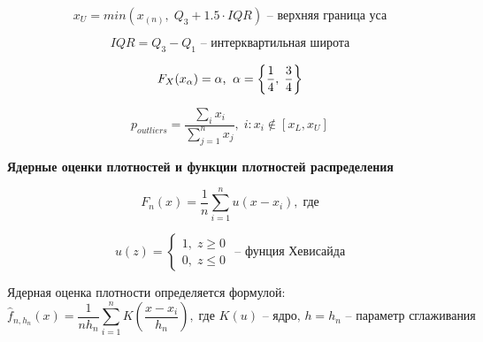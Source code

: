 \documentclass[12pt]{article}
\begin{document}
\begin{equation}
    \label{3_eq:2} 
    x_U = min(x_{(n)},\; Q_3 + 1.5 \cdot IQR)\text{ -- верхняя граница уса}
\end{equation}

\begin{equation}
    \label{3_eq:3} 
    IQR = Q_3 - Q_1   \text{ -- интерквартильная широта}
\end{equation}



\begin{equation}
    \label{3_eq:4}
    F_X(x_{\alpha}) = \alpha \text{,\;\;} \alpha = \left\{ \frac{1}{4}, \; \frac{3}{4} \right\}
\end{equation}


\begin{equation}
\label{3_eq:5}
    p_{outliers} = \frac{\sum_{i}^{} x_i}{\sum_{j = 1}^{n} x_j}, \; i: x_i \notin [x_L, x_U] 
\end{equation} 

\textbf{Ядерные оценки плотностей и функции плотностей распределения} 


\begin{equation} 
    \hat{F_n}(x) = \frac{1}{n} \sum_{i=1}^{n}{u(x - x_i)}, \; \label{4_eq:1} \text{где}
\end{equation}

\begin{equation} 
    u(z) = 
    \begin{cases}
        1, \; z \geq 0 \\
        0, \; z \leq 0
    \end{cases}
    \text{ – фунция Хевисайда} 
    \label{4_eq:2}
\end{equation}

Ядерная оценка плотности определяется формулой:
\begin{equation}
    \hat{f}_{n, h_n}(x)=\frac{1}{nh_n} \sum_{i=1}^{n}{K \left(\frac{x - x_i}{h_n}\right)}, \; \label{4_eq:3} \text{где $K(u)$ – ядро, $h = h_n$ – параметр сглаживания}
\end{equation}
\end{document}
